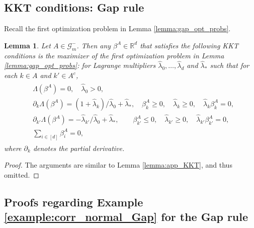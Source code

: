 \documentclass[aap,preprint]{imsart}
\newcommand{\bR}{{\mathbb{R}}}
\theoremstyle{plain}
\newtheorem{lemma}[theorem]{Lemma}
\theoremstyle{definition}
\begin{document}
\begin{appendix}
\subsection{KKT conditions: Gap rule}\label{app:KKT_gap}
Recall the first optimization problem in  Lemma \ref{lemma:gap_opt_probs}.

\begin{lemma}\label{lemma:app_Gap_KKT}
Let $A \in \mathcal{G}_m^{-}$. Then any $\beta^A \in \bR^d$ that satisfies the following KKT conditions is the maximizer of the first optimization problem in Lemma \ref{lemma:gap_opt_probs}:
for  Lagrange multipliers $\widehat{\lambda}_{0},\ldots,  \widehat{\lambda}_{d}$ and $\widehat{\lambda}_{*}$ such that for each $k \in A$ and $k' \in A^c$,
\begin{align*}%
\begin{split}
& \Lambda(\beta^A) = 0, \quad \widehat{\lambda}_0 > 0, \\
& \partial_k \Lambda(\beta^A) =(1+\widehat{\lambda}_k)/\widehat{\lambda}_0 + \widehat{\lambda}_{*}, \quad  \beta^A_{k} \geq 0, \quad \widehat{\lambda}_k \geq 0, \quad \widehat{\lambda}_k \beta^A_{k} = 0,\\
&\partial_{k'}\Lambda(\beta^A) = -\widehat{\lambda}_{k'}/\widehat{\lambda}_0 + \widehat{\lambda}_{*},\qquad \beta^A_{k'} \leq 0, \quad \widehat{\lambda}_{k'} \geq 0, \quad
\widehat{\lambda}_{k'} \beta^A_{k'} = 0,
\\
&\sum_{i \in [d]} \beta^{A}_i = 0,
\end{split}
\end{align*}
where $\partial_k$ denotes the partial derivative. %
\end{lemma}
\begin{proof}
The arguments are similar to Lemma \ref{lemma:app_KKT}, and thus omitted.
\end{proof}

\subsection{Proofs regarding Example \ref{example:corr_normal_Gap} for the Gap rule}\label{app:gap_example_corrnormal_proof}


\end{appendix}
\end{document}
